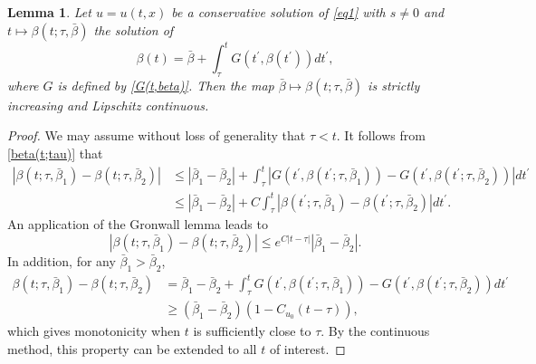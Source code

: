 \documentclass[10pt]{article}
\newtheorem{lemm}[theo]{Lemma}
\numberwithin{equation}{section}
\begin{document}
	\begin{lemm}\label{beta_monotone}
		Let $u=u(t,x)$ be a conservative solution of \eqref{eq1} with $s\neq0$ and $t\mapsto\beta(t;\tau,\bar{\beta})$ the solution of
		\begin{equation}\label{beta(t;tau)}
			\beta(t)=\bar{\beta}+\int_\tau^tG(t^\prime,\beta(t^\prime))dt^\prime,
		\end{equation}
		where $G$ is defined by \eqref{G(t,beta)}. Then the map $\bar{\beta}\mapsto\beta(t;\tau,\bar{\beta})$ is strictly increasing and Lipschitz continuous.
		
	\end{lemm}
	\begin{proof}
		We may assume without loss of generality that $\tau<t$. It follows from \eqref{beta(t;tau)} that
		\begin{align*}
			|\beta(t;\tau,\bar{\beta}_{1})-\beta(t;\tau,\bar{\beta}_{2})|
			& \leq|\bar{\beta}_{1}-\bar{\beta}_{2}|+\int_{\tau}^{t}\left|G(t^\prime,\beta(t^\prime;\tau,\bar{\beta}_{1}))-G(t^\prime,\beta(t^\prime;\tau,\bar{\beta}_{2}))\right|dt^\prime \\
			& \leq|\bar{\beta}_{1}-\bar{\beta}_{2}|+C\int_{\tau}^{t}|\beta(t^\prime;\tau,\bar{\beta}_{1})-\beta(t^\prime;\tau,\bar{\beta}_{2})|dt^\prime.
		\end{align*}
		An application of the Gronwall lemma leads to
		$$|\beta(t;\tau,\bar{\beta}_{1})-\beta(t;\tau,\bar{\beta}_{2})|\leq e^{C|t-\tau|}|\bar{\beta}_{1}-\bar{\beta}_{2}|.$$
		In addition, for any $\bar{\beta}_{1}>\bar{\beta}_{2}$,
		\begin{align*}
			\beta(t;\tau,\bar{\beta}_{1})-\beta(t;\tau,\bar{\beta}_{2})
			& =\bar{\beta}_{1}-\bar{\beta}_{2}+\int_{\tau}^{t}G(t^\prime,\beta(t^\prime;\tau,\bar{\beta}_{1}))-G(t^\prime,\beta(t^\prime;\tau,\bar{\beta}_{2}))dt^\prime \\
			& \geq(\bar{\beta}_{1}-\bar{\beta}_{2})(1-C_{u_0}(t-\tau)),
		\end{align*}
		which gives monotonicity when $t$ is sufficiently close to $\tau$. By the continuous method, this property can be extended to all $t$ of interest.
	\end{proof}
	
\end{document}
